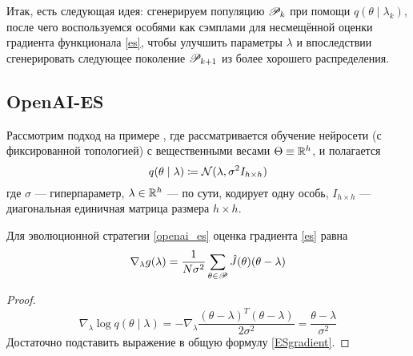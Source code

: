 Итак, есть следующая идея: сгенерируем популяцию $\mathscr{P}_k$ при помощи $q(\theta \mid \lambda_k)$, после чего воспользуемся особями как сэмплами для несмещённой оценки градиента функционала \eqref{es}, чтобы улучшить параметры $\lambda$ и впоследствии сгенерировать следующее поколение $\mathscr{P}_{k+1}$ из более хорошего распределения.



\subsection{OpenAI-ES}

Рассмотрим подход на примере , где рассматривается обучение нейросети (с фиксированной топологией) с вещественными весами $\Theta \equiv \mathbb{R}^h$, и полагается
\begin{equation}\label{openai_es}
q(\theta \mid \lambda) \coloneqq \mathcal{N}(\lambda, \sigma^2I_{h \times h})
\end{equation}
где $\sigma$ --- гиперпараметр, $\lambda \in \mathbb{R}^h$ --- по сути, кодирует одну особь, $I_{h \times h}$ --- диагональная единичная матрица размера $h \times h$.

\begin{theorem}
Для эволюционной стратегии \eqref{openai_es} оценка градиента \eqref{es} равна
\begin{equation}\label{openai_es_gradient}
\nabla_\lambda g(\lambda) = \frac{1}{N\sigma^2} \sum_{\theta \in \mathscr{P}} \hat{J}(\theta) (\theta - \lambda)
\end{equation}
\begin{proof}
$$\nabla_\lambda \log q(\theta \mid \lambda) = -\nabla_\lambda \frac{\left(\theta - \lambda \right)^T \left( \theta - \lambda \right)}{2 \sigma^2} = \frac{\theta - \lambda}{\sigma^2}$$
Достаточно подставить выражение в общую формулу \eqref{ESgradient}.
\end{proof}
\end{theorem}

